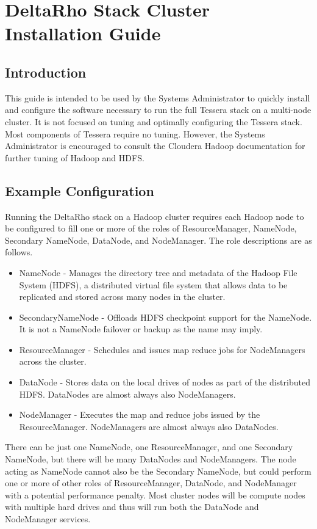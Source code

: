 \section{DeltaRho Stack Cluster Installation Guide}
\subsection{Introduction}
This guide is intended to be used by the Systems Administrator to quickly
install and configure the software necessary to run the full Tessera
stack on a multi-node cluster.  It is not focused on tuning and optimally
configuring the Tessera stack.  Most components of Tessera require no
tuning.  However, the Systems Administrator is encouraged to consult the
Cloudera Hadoop documentation for further tuning of Hadoop and HDFS.


\subsection{Example Configuration}
Running the DeltaRho stack on a Hadoop cluster requires each Hadoop node to be configured to fill one or more of the roles of ResourceManager, NameNode, Secondary NameNode, DataNode, and NodeManager. The role descriptions are as follows.

\begin{itemize}
\item NameNode - Manages the directory tree and metadata of the Hadoop File System (HDFS), a distributed virtual file system that allows data to be replicated and stored across many nodes in the cluster.
\item SecondaryNameNode - Offloads HDFS checkpoint support for the NameNode.  It is not a NameNode failover or backup as the name may imply.
\item ResourceManager - Schedules and issues map reduce jobs for NodeManagers across the cluster.
\item DataNode - Stores data on the local drives of nodes as part of the distributed HDFS.  DataNodes are almost always also NodeManagers.
\item NodeManager - Executes the map and reduce jobs issued by the ResourceManager. NodeManagers are almost always also DataNodes.
\end{itemize}

There can be just one NameNode, one ResourceManager, and one Secondary
NameNode, but there will be many DataNodes and NodeManagers.  The node
acting as NameNode cannot also be the Secondary NameNode, but could
perform one or more of other roles of ResourceManager, DataNode, and
NodeManager with a potential  performance penalty.  Most cluster nodes
will be compute nodes with multiple hard drives and thus will run both
the DataNode and NodeManager services.


